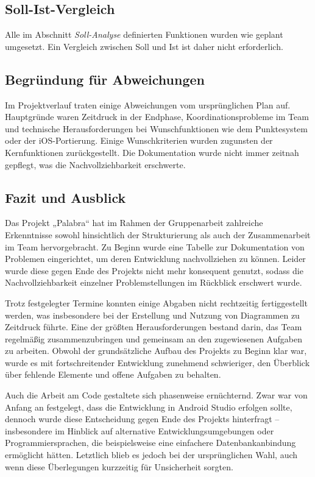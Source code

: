 \documentclass[12pt,a4paper]{article}
\begin{document}
\subsection{Soll-Ist-Vergleich}
Alle im Abschnitt \textit{Soll-Analyse} definierten Funktionen wurden wie geplant umgesetzt. Ein Vergleich zwischen Soll und Ist ist daher nicht erforderlich.

\subsection{Begründung für Abweichungen}
Im Projektverlauf traten einige Abweichungen vom ursprünglichen Plan auf. Hauptgründe waren Zeitdruck in der Endphase, Koordinationsprobleme im Team und technische Herausforderungen bei Wunschfunktionen wie dem Punktesystem oder der iOS-Portierung. Einige Wunschkriterien wurden zugunsten der Kernfunktionen zurückgestellt. Die Dokumentation wurde nicht immer zeitnah gepflegt, was die Nachvollziehbarkeit erschwerte.

\subsection{Fazit und Ausblick}
Das Projekt „Palabra“ hat im Rahmen der Gruppenarbeit zahlreiche Erkenntnisse sowohl hinsichtlich der Strukturierung als auch der Zusammenarbeit im Team hervorgebracht. Zu Beginn wurde eine Tabelle zur Dokumentation von Problemen eingerichtet, um deren Entwicklung nachvollziehen zu können. Leider wurde diese gegen Ende des Projekts nicht mehr konsequent genutzt, sodass die Nachvollziehbarkeit einzelner Problemstellungen im Rückblick erschwert wurde.

Trotz festgelegter Termine konnten einige Abgaben nicht rechtzeitig fertiggestellt werden, was insbesondere bei der Erstellung und Nutzung von Diagrammen zu Zeitdruck führte. Eine der größten Herausforderungen bestand darin, das Team regelmäßig zusammenzubringen und gemeinsam an den zugewiesenen Aufgaben zu arbeiten. Obwohl der grundsätzliche Aufbau des Projekts zu Beginn klar war, wurde es mit fortschreitender Entwicklung zunehmend schwieriger, den Überblick über fehlende Elemente und offene Aufgaben zu behalten.

Auch die Arbeit am Code gestaltete sich phasenweise ernüchternd. Zwar war von Anfang an festgelegt, dass die Entwicklung in Android Studio erfolgen sollte, dennoch wurde diese Entscheidung gegen Ende des Projekts hinterfragt – insbesondere im Hinblick auf alternative Entwicklungsumgebungen oder Programmiersprachen, die beispielsweise eine einfachere Datenbankanbindung ermöglicht hätten. Letztlich blieb es jedoch bei der ursprünglichen Wahl, auch wenn diese Überlegungen kurzzeitig für Unsicherheit sorgten.
\end{document}
